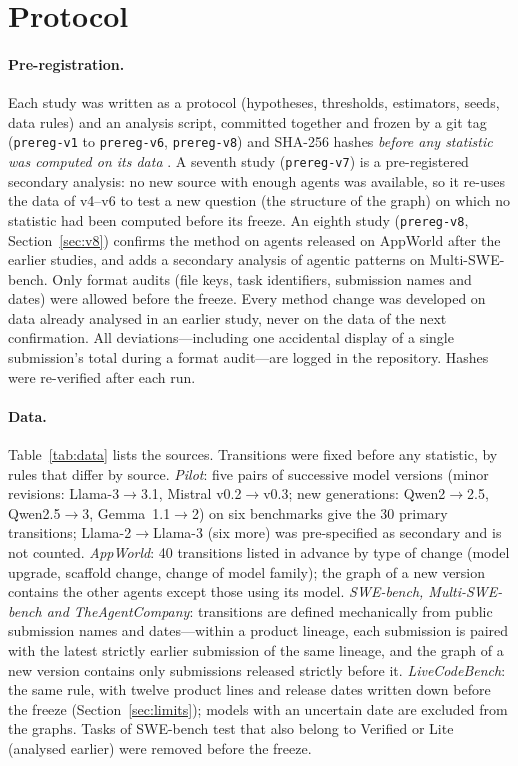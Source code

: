 \documentclass[11pt]{article}
\begin{document}
\section{Protocol}
\label{sec:protocol}
\paragraph{Pre-registration.} Each study was written as a protocol (hypotheses, thresholds, estimators, seeds,
data rules) and an analysis script, committed together and frozen by a git tag (\texttt{prereg-v1} to
\texttt{prereg-v6}, \texttt{prereg-v8}) and SHA-256 hashes \emph{before any statistic was computed on its data}
\citep{nosek2018prereg}. A seventh study (\texttt{prereg-v7}) is a pre-registered secondary analysis: no new
source with enough agents was available, so it re-uses the data of v4--v6 to test a new question (the structure of the
graph) on which no statistic had been computed before its freeze. An eighth study (\texttt{prereg-v8},
Section~\ref{sec:v8}) confirms the method on \NEightAgents{} agents released on AppWorld after the earlier studies,
and adds a secondary analysis of agentic patterns on Multi-SWE-bench. Only format audits (file keys, task identifiers, submission names and dates) were
allowed before the freeze. Every method change was developed on data already analysed in an earlier study, never on
the data of the next confirmation. All deviations---including one accidental display of a single submission's
total during a format audit---are logged in the repository. Hashes were re-verified after each run.

\paragraph{Data.} Table~\ref{tab:data} lists the sources. Transitions were fixed before any statistic, by rules that
differ by source. \emph{Pilot}: five pairs of successive model versions (minor revisions: Llama-3$\to$3.1, Mistral
v0.2$\to$v0.3; new generations: Qwen2$\to$2.5, Qwen2.5$\to$3, Gemma~1.1$\to$2) on six benchmarks give the 30 primary
transitions; Llama-2$\to$Llama-3 (six more) was pre-specified as secondary and is not counted. \emph{AppWorld}: 40
transitions listed in advance by type of change (model upgrade, scaffold change, change of model family); the graph of a
new version contains the other agents except those using its model. \emph{SWE-bench, Multi-SWE-bench and
TheAgentCompany}: transitions are defined mechanically from public submission names and dates---within a product
lineage, each submission is paired with the latest strictly earlier submission of the same lineage, and the graph of a
new version contains only submissions released strictly before it. \emph{LiveCodeBench}: the same rule, with twelve
product lines and release dates written down before the freeze (Section~\ref{sec:limits}); models with an uncertain date
are excluded from the graphs. Tasks of SWE-bench test that also belong to Verified or Lite (analysed earlier) were
removed before the freeze.
\end{document}
